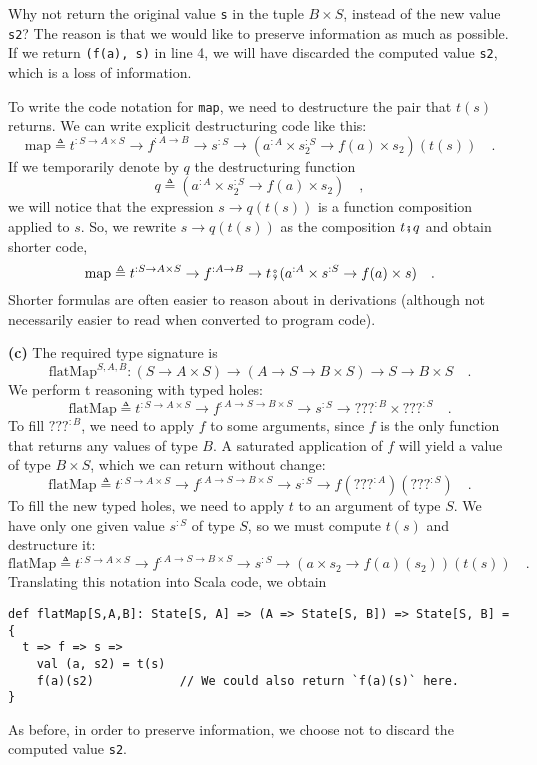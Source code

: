 \noindent Why not return the original value \lstinline!s! in the
tuple $B\times S$, instead of the new value \lstinline!s2!? The
reason is that we would like to preserve information as much as possible.
If we return \lstinline!(f(a), s)! in line 4, we will have discarded
the computed value \lstinline!s2!, which is a loss of information.

To write the code notation for \lstinline!map!, we need to destructure
the pair that $t(s)$ returns. We can write explicit destructuring
code like this:
\[
\text{map}\triangleq t^{:S\rightarrow A\times S}\rightarrow f^{:A\rightarrow B}\rightarrow s^{:S}\rightarrow(a^{:A}\times s_{2}^{:S}\rightarrow f(a)\times s_{2})(t(s))\quad.
\]
If we temporarily denote by $q$ the destructuring function 
\[
q\triangleq(a^{:A}\times s_{2}^{:S}\rightarrow f(a)\times s_{2})\quad,
\]
we will notice that the expression $s\rightarrow q(t(s))$ is a function
composition applied to $s$. So, we rewrite $s\rightarrow q(t(s))$
as the composition $t\bef q$ and obtain shorter code, 
\[
\text{map}\triangleq t^{:S\rightarrow A\times S}\rightarrow f^{:A\rightarrow B}\rightarrow t\bef(a^{:A}\times s^{:S}\rightarrow f(a)\times s)\quad.
\]
Shorter formulas are often easier to reason about in derivations (although
not necessarily easier to read when converted to program code).

\textbf{(c)} The required type signature is
\[
\text{flatMap}^{S,A,B}:(S\rightarrow A\times S)\rightarrow(A\rightarrow S\rightarrow B\times S)\rightarrow S\rightarrow B\times S\quad.
\]
We perform t reasoning with typed holes:
\[
\text{flatMap}\triangleq t^{:S\rightarrow A\times S}\rightarrow f^{:A\rightarrow S\rightarrow B\times S}\rightarrow s^{:S}\rightarrow\text{???}^{:B}\times???^{:S}\quad.
\]
To fill $\text{???}^{:B}$, we need to apply $f$ to some arguments,
since $f$ is the only function that returns any values of type $B$.
A saturated application of $f$ will yield a value of type $B\times S$,
which we can return without change:
\[
\text{flatMap}\triangleq t^{:S\rightarrow A\times S}\rightarrow f^{:A\rightarrow S\rightarrow B\times S}\rightarrow s^{:S}\rightarrow f(\text{???}^{:A})(\text{???}^{:S})\quad.
\]
To fill the new typed holes, we need to apply $t$ to an argument
of type $S$. We have only one given value $s^{:S}$ of type $S$,
so we must compute $t(s)$ and destructure it:
\[
\text{flatMap}\triangleq t^{:S\rightarrow A\times S}\rightarrow f^{:A\rightarrow S\rightarrow B\times S}\rightarrow s^{:S}\rightarrow\left(a\times s_{2}\rightarrow f(a)(s_{2})\right)(t(s))\quad.
\]
Translating this notation into Scala code, we obtain
\begin{lstlisting}
def flatMap[S,A,B]: State[S, A] => (A => State[S, B]) => State[S, B] = {
  t => f => s =>
    val (a, s2) = t(s)
    f(a)(s2)            // We could also return `f(a)(s)` here.
}
\end{lstlisting}
As before, in order to preserve information, we choose not to discard
the computed value \lstinline!s2!.

